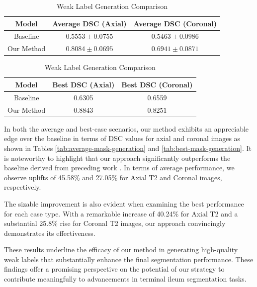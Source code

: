 \begin{table}[ht]
    \begin{subtable}[b]{\textwidth}
        \centering
        \begin{tabular}{c | c | c}
        Model & Average DSC (Axial) & Average DSC (Coronal) \\
        \hline
        Baseline & \(0.5553 \pm 0.0755\)  & \(0.5463 \pm 0.0986\)\\
        \hline
        Our Method & \(\mathbf{0.8084 \pm 0.0695}\) & \(\mathbf{0.6941 \pm 0.0871}\) 
       \end{tabular}
       \caption{Average Case Comparison}
       \label{tab:average-mask-generation}
    \end{subtable}
    \vfill
    \begin{subtable}[b]{\textwidth}
        \centering
        \begin{tabular}{c | c | c}
        Model & Best DSC (Axial) & Best DSC (Coronal) \\
        \hline
        Baseline & 0.6305 & 0.6559\\
        \hline
        Our Method & \(\mathbf{0.8843}\) & \(\mathbf{0.8251}\)
       \end{tabular}
       \caption{Best Case Comparison}
       \label{tab:best-mask-generation}
    \end{subtable}
     \caption{Weak Label Generation Comparison}
     \label{tab:mask-generation-comparison}
\end{table}

In both the average and best-case scenarios, our method exhibits an appreciable edge over the baseline in terms of DSC values for axial and coronal images as shown in Tables \ref{tab:average-mask-generation} and \ref{tab:best-mask-generation}. It is noteworthy to highlight that our approach significantly outperforms the baseline derived from preceding work \cite{Ali2022}. In terms of average performance, we observe uplifts of 45.58\% and 27.05\% for Axial T2 and Coronal images, respectively.

The sizable improvement is also evident when examining the best performance for each case type. With a remarkable increase of 40.24\% for Axial T2 and a substantial 25.8\% rise for Coronal T2 images, our approach convincingly demonstrates its effectiveness.

These results underline the efficacy of our method in generating high-quality weak labels that substantially enhance the final segmentation performance. These findings offer a promising perspective on the potential of our strategy to contribute meaningfully to advancements in terminal ileum segmentation tasks.

